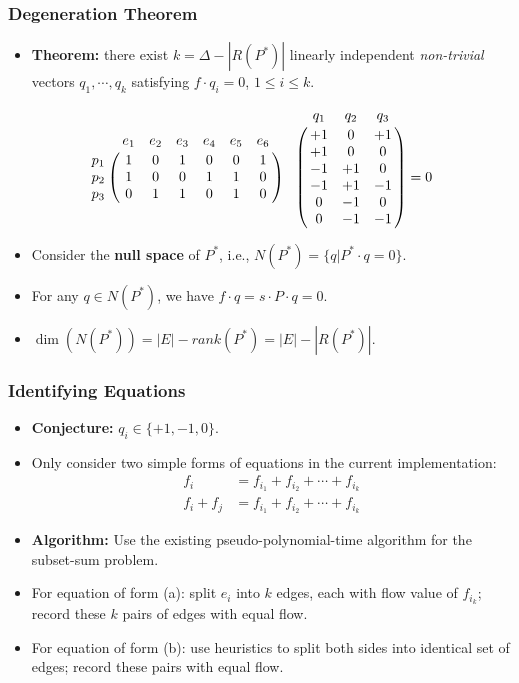 \frame
{
	\frametitle{Degeneration Theorem}
	\begin{itemize}
	\item {\bf Theorem:} there exist $k=\Delta - |R(P^*)|$ linearly independent
	{\it non-trivial} vectors $q_1,\cdots,q_k$ satisfying $f\cdot q_i = 0$, $1\le i\le k$.
	\end{itemize}

	\vspace{0.7cm}

	

	\vspace{-0.4cm}

	\begin{displaymath}
	\bordermatrix{
		~   & e_1 & e_2 & e_3 & e_4 & e_5 & e_6\cr
		p_1 & 1 & 0 & 1 & 0 & 0 & 1 \cr
		p_2 & 1 & 0 & 0 & 1 & 1 & 0 \cr
		p_3 & 0 & 1 & 1 & 0 & 1 & 0 \cr
	} 
	\bordermatrix{
   	   ~& q_1 & q_2 & q_3 \cr
		& +1 &  0 & +1  \cr
		& +1 &  0 &  0  \cr
		& -1 & +1 &  0  \cr
		& -1 & +1 & -1  \cr
		&  0 & -1 &  0  \cr
		&  0 & -1 & -1  \cr
	} = 0
	\end{displaymath}

	\begin{itemize}
	\item Consider the {\bf null space} of $P^*$, i.e., $N(P^*) = \{q | P^*\cdot q = 0\}$.
	\item For any $q\in N(P^*)$, we have $f\cdot q = s\cdot P \cdot q = 0$. 
	\item $\dim(N(P^*)) = |E| - rank(P^*) = |E| - |R(P^*)|$. 
	\end{itemize}
}

\frame
{
	\frametitle{Identifying Equations}
	\begin{itemize}
	\item {\bf Conjecture:} $q_i \in \{+1, -1, 0\}$.
	\vspace{0.2cm}
	\item Only consider two simple forms of equations in the current implementation:
		\begin{align}
		f_i & =  f_{i_1} + f_{i_2} + \cdots + f_{i_k} \tag{a}\\
		f_i + f_j & = f_{i_1} + f_{i_2} + \cdots + f_{i_k} \tag{b}
		\end{align}
	\item {\bf Algorithm:} Use the existing pseudo-polynomial-time algorithm for the subset-sum problem.
	\vspace{0.2cm}
	\item For equation of form (a): split $e_i$ into $k$ edges, each with flow
	value of $f_{i_k}$; record these $k$ pairs of edges with equal flow.
	\vspace{0.2cm}
	\item For equation of form (b): use heuristics to split both sides into
			identical set of edges; record these pairs with equal flow.
	\end{itemize}
}


